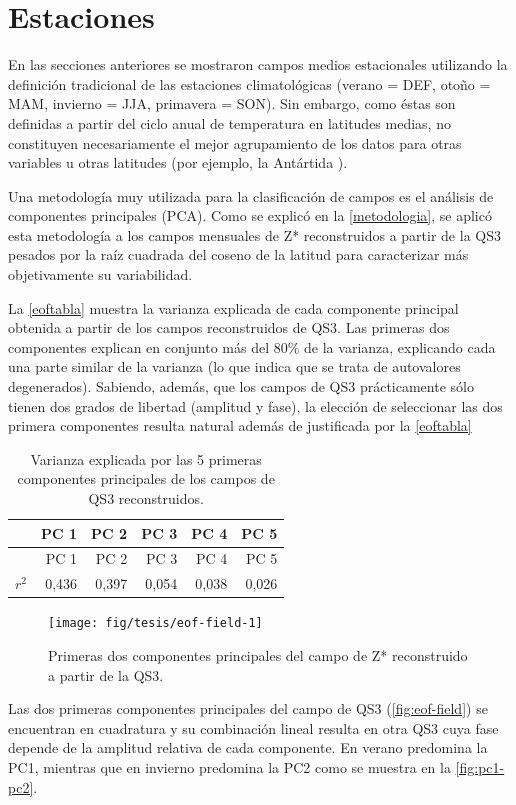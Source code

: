 \documentclass[spanish,a4paper,12pt,oneside]{book}
\begin{document}
\section{Estaciones}\label{estaciones}

En las secciones anteriores se mostraron campos medios estacionales
utilizando la definición tradicional de las estaciones climatológicas
(verano = DEF, otoño = MAM, invierno = JJA, primavera = SON). Sin
embargo, como éstas son definidas a partir del ciclo anual de
temperatura en latitudes medias, no constituyen necesariamente el mejor
agrupamiento de los datos para otras variables u otras latitudes (por
ejemplo, la Antártida \citep{King1997}).

Una metodología muy utilizada para la clasificación de campos es el
análisis de componentes principales (PCA). Como se explicó en la
\autoref{metodologia}, se aplicó esta metodología a los campos mensuales
de Z* reconstruidos a partir de la QS3 pesados por la raíz cuadrada del
coseno de la latitud para caracterizar más objetivamente su
variabilidad.

La \autoref{eoftabla} muestra la varianza explicada de cada componente
principal obtenida a partir de los campos reconstruidos de QS3. Las
primeras dos componentes explican en conjunto más del 80\% de la
varianza, explicando cada una parte similar de la varianza (lo que
indica que se trata de autovalores degenerados). Sabiendo, además, que
los campos de QS3 prácticamente sólo tienen dos grados de libertad
(amplitud y fase), la elección de seleccionar las dos primera
componentes resulta natural además de justificada por la
\autoref{eoftabla}

\begin{longtable}[]{@{}lrrrrr@{}}
\caption{Varianza explicada por las 5 primeras componentes principales
de los campos de QS3 reconstruidos.\label{eoftabla}}\tabularnewline
\toprule
& PC 1 & PC 2 & PC 3 & PC 4 & PC 5\tabularnewline
\midrule
\endfirsthead
\toprule
& PC 1 & PC 2 & PC 3 & PC 4 & PC 5\tabularnewline
\midrule
\endhead
\(r^2\) & 0,436 & 0,397 & 0,054 & 0,038 & 0,026\tabularnewline
\bottomrule
\end{longtable}

\begin{figure}
\texttt{[image: fig/tesis/eof-field-1]} \caption{Primeras dos componentes principales del campo de Z* reconstruido a partir de la QS3.}\label{fig:eof-field}
\end{figure}

Las dos primeras componentes principales del campo de QS3
(\autoref{fig:eof-field}) se encuentran en cuadratura y su combinación
lineal resulta en otra QS3 cuya fase depende de la amplitud relativa de
cada componente. En verano predomina la PC1, mientras que en invierno
predomina la PC2 como se muestra en la \autoref{fig:pc1-pc2}.
\end{document}
